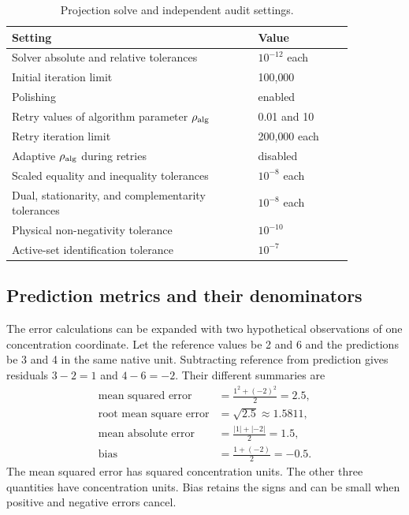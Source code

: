 \begin{table}[htbp]
\centering\small
\caption{Projection solve and independent audit settings.}
\label{tab:plant_projection_settings}
\begin{tabular}{p{0.62\linewidth}p{0.24\linewidth}}
\toprule Setting & Value\\\midrule
Solver absolute and relative tolerances & $10^{-12}$ each\\
Initial iteration limit & 100{,}000\\
Polishing & enabled\\
Retry values of algorithm parameter $\rho_{\rm alg}$ & 0.01 and 10\\
Retry iteration limit & 200{,}000 each\\
Adaptive $\rho_{\rm alg}$ during retries & disabled\\
Scaled equality and inequality tolerances & $10^{-8}$ each\\
Dual, stationarity, and complementarity tolerances & $10^{-8}$ each\\
Physical non-negativity tolerance & $10^{-10}$\\
Active-set identification tolerance & $10^{-7}$\\
\bottomrule
\end{tabular}
\end{table}

\subsection{Prediction metrics and their denominators}

The error calculations can be expanded with two hypothetical observations of one concentration coordinate. Let the reference values be 2 and 6 and the predictions be 3 and 4 in the same native unit. Subtracting reference from prediction gives residuals $3-2=1$ and $4-6=-2$. Their different summaries are
\[
\begin{aligned}
\text{mean squared error}&=\frac{1^2+(-2)^2}{2}=2.5,\\
\text{root mean square error}&=\sqrt{2.5}\approx1.5811,\\
\text{mean absolute error}&=\frac{|1|+|-2|}{2}=1.5,\\
\text{bias}&=\frac{1+(-2)}{2}=-0.5.
\end{aligned}
\]
The mean squared error has squared concentration units. The other three quantities have concentration units. Bias retains the signs and can be small when positive and negative errors cancel.

